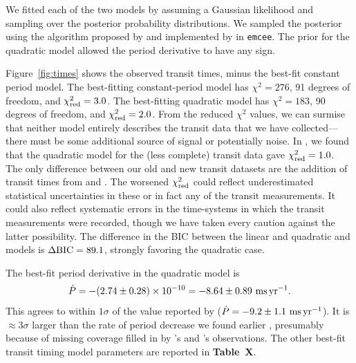 \documentclass[12pt,twocolumn,tighten]{aastex62}
\begin{document}
We fitted each of the two models by assuming a Gaussian likelihood and
sampling over the posterior probability distributions.  We sampled the
posterior using the algorithm proposed by
\citet{goodman_ensemble_2010} and implemented by
\citet{foreman-mackey_emcee_2013} in \texttt{emcee}.  The prior for
the quadratic model allowed the period derivative to have any sign.

Figure~\ref{fig:times} shows the observed transit times, minus the
best-fit constant period model.  The best-fitting constant-period
model has $\chi^2 = 276$, 91 degrees of freedom, and $\chi^2_{\rm
red}=3.0$.  The best-fitting quadratic model has $\chi^2 = 183$, 90
degrees of freedom, and $\chi^2_{\rm red}=2.0$.  From the reduced
$\chi^2$ values, we can surmise that neither model entirely describes
the transit data that we have collected---there must be some
additional source of signal or potentially noise. In
\citet{bouma_wasp4b_2019}, we found that the quadratic model for the
(less complete) transit data gave $\chi^2_{\rm red}=1.0$.  The only
difference between our old and new transit datasets are the addition
of transit times from \citet{southworth_transit_2019} and
\citet{baluev_2019}.  The worsened $\chi^2_{\rm red}$ could reflect
underestimated statistical uncertainties in these or in fact any of
the transit measurements. It could also reflect systematic errors in
the time-systems in which the transit measurements were recorded,
though we have taken every caution against the latter possibility.
The difference in the BIC \citep{kass_bayes_1995} between the linear
and quadratic and models is $\Delta {\rm BIC} = 89.1$, strongly
favoring the quadratic case.

The best-fit period derivative in the quadratic model is
\begin{equation}
\dot{P}
  = - (2.74 \pm 0.28)\times 10^{-10}
  = - 8.64 \pm 0.89~{\rm ms}\,{\rm yr}^{-1}.
  \label{eq:dP_dt_obs}
\end{equation}
This agrees to within $1\sigma$ of the value reported by
\citet{southworth_transit_2019} ($\dot{P} = - 9.2 \pm 1.1~{\rm
ms}\,{\rm yr}^{-1}$).  It is $\approx$3$\sigma$ larger than the rate
of period decrease we found earlier \citep[$- 12.6 \pm 1.2~{\rm
ms}\,{\rm yr}^{-1}$;][]{bouma_wasp4b_2019}, presumably because of
missing coverage filled in by \citeauthor{southworth_transit_2019}'s
and \citeauthor{baluev_2019}'s observations.  The other best-fit
transit timing model parameters are reported in {\bf Table~X}.
\end{document}
